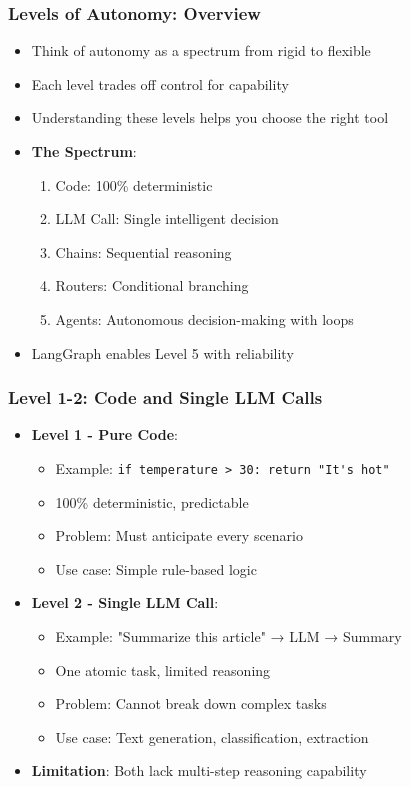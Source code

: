 \begin{frame}[fragile]\frametitle{Levels of Autonomy: Overview}
      \begin{itemize}
        \item Think of autonomy as a spectrum from rigid to flexible
        \item Each level trades off control for capability
        \item Understanding these levels helps you choose the right tool
        \item \textbf{The Spectrum}:
        \begin{enumerate}
            \item Code: 100\% deterministic
            \item LLM Call: Single intelligent decision
            \item Chains: Sequential reasoning
            \item Routers: Conditional branching
            \item Agents: Autonomous decision-making with loops
        \end{enumerate}
        \item LangGraph enables Level 5 with reliability
      \end{itemize}
\end{frame}

\begin{frame}[fragile]\frametitle{Level 1-2: Code and Single LLM Calls}
      \begin{itemize}
        \item \textbf{Level 1 - Pure Code}:
        \begin{itemize}
            \item Example: \lstinline|if temperature > 30: return "It's hot"| 
            \item 100\% deterministic, predictable
            \item Problem: Must anticipate every scenario
            \item Use case: Simple rule-based logic
        \end{itemize}
        \item \textbf{Level 2 - Single LLM Call}:
        \begin{itemize}
            \item Example: "Summarize this article" → LLM → Summary
            \item One atomic task, limited reasoning
            \item Problem: Cannot break down complex tasks
            \item Use case: Text generation, classification, extraction
        \end{itemize}
        \item \textbf{Limitation}: Both lack multi-step reasoning capability
      \end{itemize}
\end{frame}


